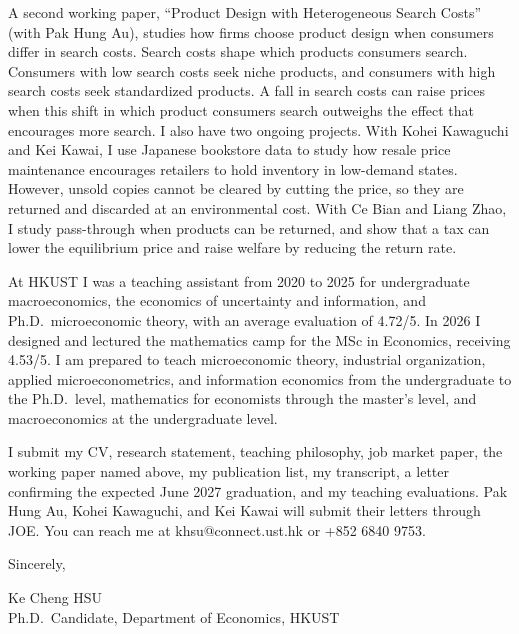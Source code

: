 \documentclass[11pt]{article}
\begin{document}
A second working paper, ``Product Design with Heterogeneous Search Costs'' (with Pak Hung Au), studies how firms choose product design when consumers differ in search costs. Search costs shape which products consumers search. Consumers with low search costs seek niche products, and consumers with high search costs seek standardized products. A fall in search costs can raise prices when this shift in which product consumers search outweighs the effect that encourages more search. I also have two ongoing projects. With Kohei Kawaguchi and Kei Kawai, I use Japanese bookstore data to study how resale price maintenance encourages retailers to hold inventory in low-demand states. However, unsold copies cannot be cleared by cutting the price, so they are returned and discarded at an environmental cost. With Ce Bian and Liang Zhao, I study pass-through when products can be returned, and show that a tax can lower the equilibrium price and raise welfare by reducing the return rate.

At HKUST I was a teaching assistant from 2020 to 2025 for undergraduate macroeconomics, the economics of uncertainty and information, and Ph.D.\ microeconomic theory, with an average evaluation of 4.72/5. In 2026 I designed and lectured the mathematics camp for the MSc in Economics, receiving 4.53/5. I am prepared to teach microeconomic theory, industrial organization, applied microeconometrics, and information economics from the undergraduate to the Ph.D.\ level, mathematics for economists through the master's level, and macroeconomics at the undergraduate level.

I submit my CV, research statement, teaching philosophy, job market paper, the working paper named above, my publication list, my transcript, a letter confirming the expected June 2027 graduation, and my teaching evaluations. Pak Hung Au, Kohei Kawaguchi, and Kei Kawai will submit their letters through JOE. You can reach me at khsu@connect.ust.hk or +852 6840 9753.

\vspace{0.25em}
Sincerely,

\vspace{0.25em}
Ke Cheng HSU \\
Ph.D.\ Candidate, Department of Economics, HKUST
\end{document}

